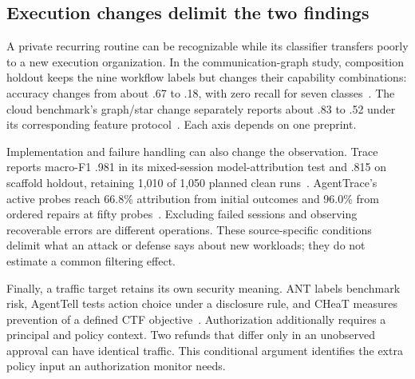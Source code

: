 \subsection{Execution changes delimit the two findings}\label{sec:targets}
A private recurring routine can be recognizable while its classifier transfers poorly to a new execution organization. In the communication-graph study, composition holdout keeps the nine workflow labels but changes their capability combinations: accuracy changes from about .67 to .18, with zero recall for seven classes~\cite[Sec.~9.12]{dangol2026workflow}. The cloud benchmark's graph/star change separately reports about .83 to .52 under its corresponding feature protocol~\cite{pouryousef2026traffic}. Each axis depends on one preprint.

Implementation and failure handling can also change the observation. Trace reports macro-F1 .981 in its mixed-session model-attribution test and .815 on scaffold holdout, retaining 1,010 of 1,050 planned clean runs~\cite{ediga2026trace}. AgentTrace's active probes reach 66.8\% attribution from initial outcomes and 96.0\% from ordered repairs at fifty probes~\cite{zhao2026agenttrace}. Excluding failed sessions and observing recoverable errors are different operations. These source-specific conditions delimit what an attack or defense says about new workloads; they do not estimate a common filtering effect.

Finally, a traffic target retains its own security meaning. ANT labels benchmark risk, AgentTell tests action choice under a disclosure rule, and CHeaT measures prevention of a defined CTF objective~\cite{li2026ant,shahriar2026agenttell,ayzenshteyn2025cheat}. Authorization additionally requires a principal and policy context. Two refunds that differ only in an unobserved approval can have identical traffic. This conditional argument identifies the extra policy input an authorization monitor needs.
